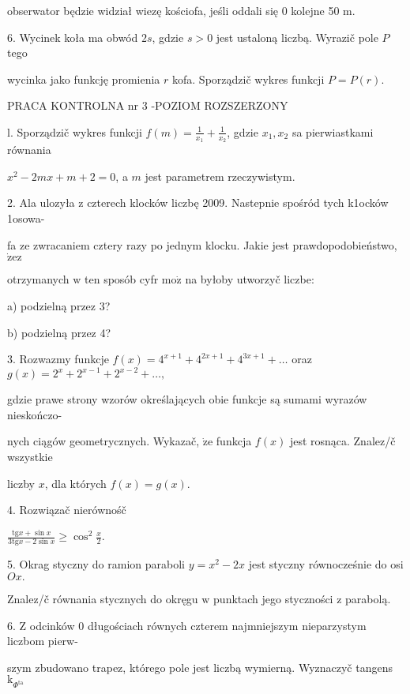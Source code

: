 \documentclass[a4paper,12pt]{article}
\begin{document}
obserwator będzie widział wiezę kościofa, jeśli oddali się $0$ kolejne 50 $\mathrm{m}.$

6. Wycinek koła ma obwód $2s$, gdzie $s > 0$ jest ustaloną liczbą. Wyrazič pole $P$ tego

wycinka jako funkcję promienia $r$ kofa. Sporządzič wykres funkcji $P=P(r).$





PRACA KONTROLNA nr 3 -POZIOM ROZSZERZONY

l. Sporządzič wykres funkcji $f(m) = \displaystyle \frac{1}{x_{1}}+\frac{1}{x_{2}}$, gdzie $x_{1}, x_{2}$ sa pierwiastkami równania

$x^{2}-2mx+m+2=0$, a $m$ jest parametrem rzeczywistym.

2. Ala ulozyła $\mathrm{z}$ czterech klocków liczbę 2009. Nastepnie spośród tych k1ocków 1osowa-

fa ze zwracaniem cztery razy po jednym klocku. Jakie jest prawdopodobieństwo, $\dot{\mathrm{z}}\mathrm{e}\mathrm{z}$

otrzymanych $\mathrm{w}$ ten sposób cyfr $\mathrm{m}\mathrm{o}\dot{\mathrm{z}}$ na byłoby utworzyč liczbe:

a) podzielną przez 3?

b) podzielną przez 4?

3. Rozwazmy funkcje $ f(x)=4^{x+1}+4^{2x+1}+4^{3x+1}+\ldots$ oraz $g(x)=2^{x}+2^{x-1}+2^{x-2}+\ldots,$

gdzie prawe strony wzorów określających obie funkcje są sumami wyrazów nieskończo-

nych ciągów geometrycznych. Wykazač, $\dot{\mathrm{z}}\mathrm{e}$ funkcja $f(x)$ jest rosnąca. Znalez/č wszystkie

liczby $x$, dla których $f(x)=g(x).$

4. Rozwiązač nierównośč

$\displaystyle \frac{\mathrm{t}\mathrm{g}x+\sin x}{3\mathrm{t}\mathrm{g}x-2\sin x}\geq\cos^{2}\frac{x}{2}.$

5. Okrag styczny do ramion paraboli $y = x^{2}-2x$ jest styczny równocześnie do osi $Ox.$

Znalez/č równania stycznych do okręgu $\mathrm{w}$ punktach jego styczności $\mathrm{z}$ parabolą.

6. $\mathrm{Z}$ odcinków $0$ długościach równych czterem najmniejszym nieparzystym liczbom pierw-

szym zbudowano trapez, którego pole jest liczbą wymierną. Wyznaczyč tangens $\mathrm{k}_{\Phi^{\mathrm{t}\mathrm{a}}}$
\end{document}
